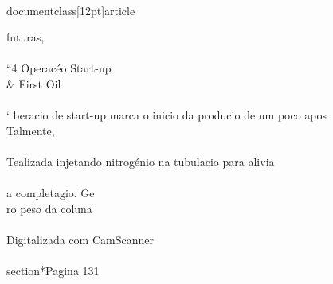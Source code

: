 \\documentclass[12pt]{article}
\begin{document}
futuras,\\
\\
“4 Operacéo Start-up \\& First Oil\\
\\
‘ beracio de start-up marca o inicio da producio de um poco apos\\
Talmente,\\
\\
Tealizada injetando nitrogénio na tubulacio para alivia\\
\\
a completagio. Ge\\
ro peso da coluna\\
\\
Digitalizada com CamScanner\\

\\section*{Pagina 131}
\end{document}
